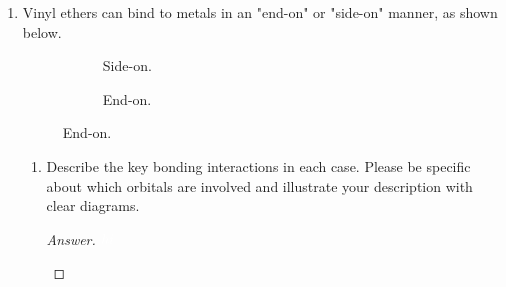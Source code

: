 \documentclass[../psets.tex]{subfiles}
\begin{document}
\begin{enumerate}
\begin{enumerate}
        \item {} from .
        \begin{proof}[Answer]
            \begin{equation*}
                \ce{2TaBr5 ->[2LiCp^*][-2LiBr] 2CpTaBr4 ->[4KC8][-4KBr] 2CpTaBr2 -> [Cp^*Ta($\mu_2${-}Br)2]2}
            \end{equation*}
        \end{proof}
        \item {} from .
        \begin{proof}[Answer]
            \begin{equation*}
                \ce{NiCl2 ->[KC8][-Cl] NiCl ->[NO-] NiClNO ->[2PPh3] (PPh3)2NiClNO}
            \end{equation*}
        \end{proof}
    \end{enumerate}
    \item Vinyl ethers can bind to metals in an "end-on" or "side-on" manner, as shown below.
    \begin{figure}[h!]
        \centering
        \begin{subfigure}[b]{0.25\linewidth}
            \centering
            \caption*{Side-on.}
        \end{subfigure}
        \begin{subfigure}[b]{0.25\linewidth}
            \centering
            \caption*{End-on.}
        \end{subfigure}
    \end{figure}
    \begin{enumerate}
        \item Describe the key bonding interactions in each case. Please be specific about which orbitals are involved and illustrate your description with clear diagrams.
        \begin{proof}[Answer]
            ${\color{white}hi}$
            \begin{figure}[H]

\end{figure}
\end{proof}
\end{enumerate}
\end{enumerate}
\end{document}
